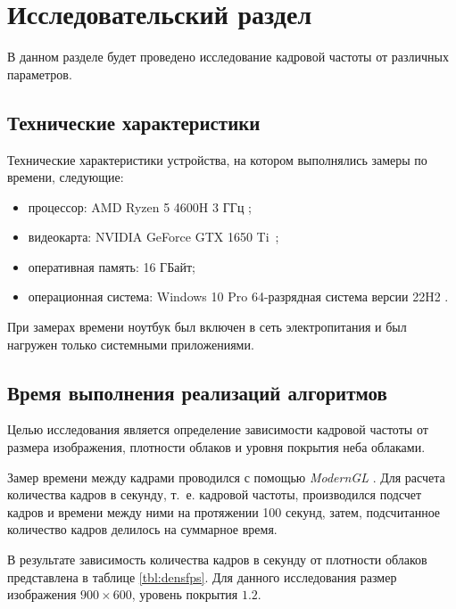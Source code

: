 \chapter{Исследовательский раздел}

В данном разделе будет проведено исследование кадровой частоты от различных параметров.

\section{Технические характеристики}

Технические характеристики устройства, на котором выполнялись замеры по времени, следующие:
\begin{itemize}
	\item процессор: AMD Ryzen 5 4600H 3 ГГц \cite{amd};
	\item видеокарта: NVIDIA GeForce GTX 1650 Ti~\cite{nvidia};
	\item оперативная память: 16 ГБайт;
	\item операционная система: Windows 10 Pro 64-разрядная система версии 22H2 \cite{windows}.
\end{itemize}

При замерах времени ноутбук был включен в сеть электропитания и был нагружен только системными приложениями.

\section{Время выполнения реализаций алгоритмов}

Целью исследования является определение зависимости кадровой частоты от размера изображения, плотности облаков и уровня покрытия неба облаками.

Замер времени между кадрами проводился с помощью \textit{ModernGL} \cite{moderngl}. Для расчета количества кадров в секунду, т.~е. кадровой частоты, производился подсчет кадров и времени между ними на протяжении 100 секунд, затем, подсчитанное количество кадров делилось на суммарное время.

В результате зависимость количества кадров в секунду от плотности облаков представлена в таблице \ref{tbl:densfps}. Для данного исследования размер изображения $900 \times 600$, уровень покрытия $1.2$.

